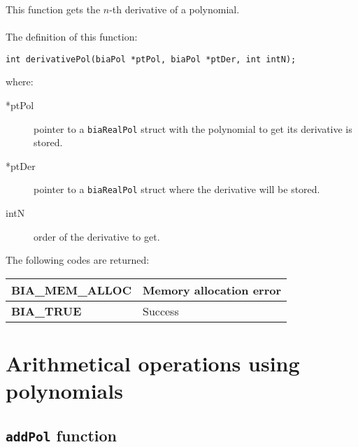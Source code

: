 This function gets the $n$-th derivative of a polynomial.\\ \\
%
The definition of this function:
%
\begin{verbatim}
int derivativePol(biaPol *ptPol, biaPol *ptDer, int intN);
\end{verbatim}
%
where:
\begin{description} 
\item[*ptPol] pointer to a \texttt{biaRealPol} struct with the polynomial to get its derivative is stored.
\item[*ptDer] pointer to a \texttt{biaRealPol} struct where the derivative will be stored.
\item[intN] order of the derivative to get.
\end{description}
%
The following codes are returned:
%
\begin{center}
\begin{tabular}{|l|l|}
\hline
\textbf{BIA\_MEM\_ALLOC} & Memory allocation error \\
\hline
\textbf{BIA\_TRUE} & Success \\
\hline
\end{tabular}
\end{center}
%
%

\section{Arithmetical operations using polynomials}

\subsection{\texttt{addPol} function}

